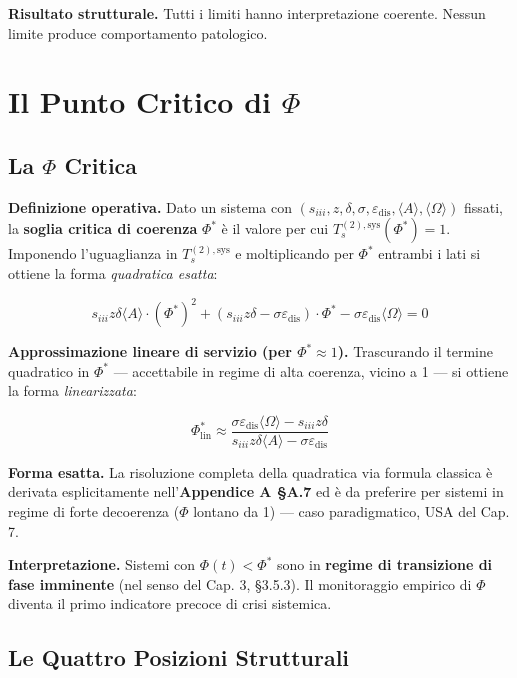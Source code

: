 \Proved{} \textbf{Risultato strutturale.} Tutti i limiti hanno
interpretazione coerente. Nessun limite produce comportamento
patologico.



\section{Il Punto Critico di $\Phi$}\label{il-punto-critico-di-ux3c6}

\subsection{La $\Phi$ Critica}\label{la-ux3c6-critica}

\Hypoth{} \textbf{Definizione operativa.} Dato un sistema con
\((s_{iii}, z, \delta, \sigma, \varepsilon_{\text{dis}}, \langle A\rangle, \langle\Omega\rangle)\)
fissati, la \textbf{soglia critica di coerenza} \(\Phi^*\) è il valore
per cui \(T_s^{(2),\text{sys}}(\Phi^*) = 1\). Imponendo l'uguaglianza in
\(T_s^{(2),\text{sys}}\) e moltiplicando per \(\Phi^*\) entrambi i lati
si ottiene la forma \emph{quadratica esatta}:

\[
s_{iii} z \delta \langle A\rangle \cdot (\Phi^*)^2 + (s_{iii} z \delta - \sigma \varepsilon_{\text{dis}}) \cdot \Phi^* - \sigma \varepsilon_{\text{dis}} \langle\Omega\rangle = 0
\]

\Hypoth{} \textbf{Approssimazione lineare di servizio (per
\(\Phi^* \approx 1\)).} Trascurando il termine quadratico in \(\Phi^*\)
--- accettabile in regime di alta coerenza, vicino a 1 --- si ottiene la
forma \emph{linearizzata}:

\[
\Phi^*_{\text{lin}} \approx \frac{\sigma \varepsilon_{\text{dis}} \langle\Omega\rangle - s_{iii} z \delta}{s_{iii} z \delta \langle A\rangle - \sigma \varepsilon_{\text{dis}}}
\]

\Proved{} \textbf{Forma esatta.} La risoluzione completa della
quadratica via formula classica è derivata esplicitamente
nell'\textbf{Appendice A \S{}A.7} ed è da preferire per sistemi in regime
di forte decoerenza (\(\Phi\) lontano da 1) --- caso paradigmatico, USA
del Cap. 7.

\Hypoth{} \textbf{Interpretazione.} Sistemi con \(\Phi(t) < \Phi^*\)
sono in \textbf{regime di transizione di fase imminente} (nel senso del
Cap. 3, \S{}3.5.3). Il monitoraggio empirico di \(\Phi\) diventa il primo
indicatore precoce di crisi sistemica.

\subsection{Le Quattro Posizioni
Strutturali}\label{le-quattro-posizioni-strutturali}

